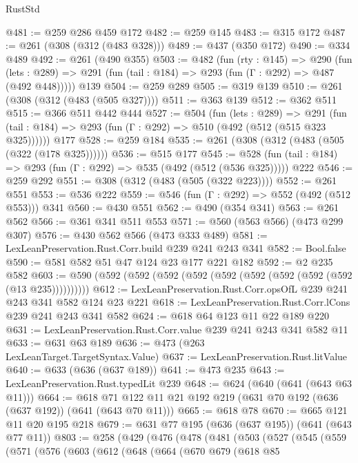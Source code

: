 \begin{lexlean}{RustStd}
\begin{coremodule}
@481 := @259 @286 @459 @172
@482 := @259 @145
@483 := @315 @172
@487 := @261 (@308 (@312 (@483 @328)))
@489 := @437 (@350 @172)
@490 := @334 @489
@492 := @261 (@490 @355)
@503 := @482
    (fun (rty : @145) =>
    @290
      (fun (lets : @289) => @291 (fun (tail : @184) => @293 (fun (Γ : @292) => @487 (@492 @448)))))
    @139
@504 := @259 @289
@505 := @319 @139
@510 := @261 (@308 (@312 (@483 (@505 @327))))
@511 := @363 @139
@512 := @362 @511
@515 := @366 @511 @442 @444
@527 := @504
    (fun (lets : @289) =>
    @291 (fun (tail : @184) => @293 (fun (Γ : @292) => @510 (@492 (@512 (@515 @323 @325))))))
    @177
@528 := @259 @184
@535 := @261 (@308 (@312 (@483 (@505 (@322 (@178 @325))))))
@536 := @515 @177
@545 := @528 (fun (tail : @184) => @293 (fun (Γ : @292) => @535 (@492 (@512 (@536 @325))))) @222
@546 := @259 @292
@551 := @308 (@312 (@483 (@505 (@322 @223))))
@552 := @261 @551
@553 := @536 @222
@559 := @546 (fun (Γ : @292) => @552 (@492 (@512 @553))) @341
@560 := @430 @551
@562 := @490 (@354 @341)
@563 := @261 @562
@566 := @361 @341 @511 @553
@571 := @560 (@563 @566) (@473 @299 @307)
@576 := @430 @562 @566 (@473 @333 @489)
@581 := LexLeanPreservation.Rust.Corr.build @239 @241 @243 @341
@582 := Bool.false
@590 := @581 @582 @51 @47 @124 @23 @177 @221 @182
@592 := @2 @235 @582
@603 := @590 (@592 (@592 (@592 (@592 (@592 (@592 (@592 (@592 (@592 (@13 @235))))))))))
@612 := LexLeanPreservation.Rust.Corr.opsOfL @239 @241 @243 @341 @582 @124 @23 @221
@618 := LexLeanPreservation.Rust.Corr.lCons @239 @241 @243 @341 @582
@624 := @618 @64 @123 @11 @22 @189 @220
@631 := LexLeanPreservation.Rust.Corr.value @239 @241 @243 @341 @582 @11
@633 := @631 @63 @189
@636 := @473 (@263 LexLeanTarget.TargetSyntax.Value)
@637 := LexLeanPreservation.Rust.litValue
@640 := @633 (@636 (@637 @189))
@641 := @473 @235
@643 := LexLeanPreservation.Rust.typedLit @239
@648 := @624 (@640 (@641 (@643 @63 @11)))
@664 := @618 @71 @122 @11 @21 @192 @219 (@631 @70 @192 (@636 (@637 @192)) (@641 (@643 @70 @11)))
@665 := @618 @78
@670 := @665 @121 @11 @20 @195 @218
@679 := @631 @77 @195 (@636 (@637 @195)) (@641 (@643 @77 @11))
@803 := @258
    (@429
      (@476
        (@478
          (@481
            (@503
              (@527
                (@545
                  (@559
                    (@571
                      (@576
                        (@603
                          (@612
                            (@648
                              (@664
                                (@670
                                  @679
                                  (@618
                                    @85

\end{coremodule}
\end{lexlean}
